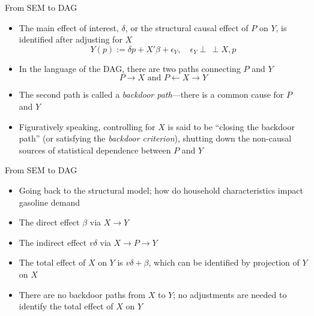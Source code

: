 \documentclass[aspectratio=1610,12pt,xcolor=dvipsnames]{beamer}
\newcommand{\indep}{\perp\!\!\!\, \perp}
\begin{document}
\begin{frame}{From SEM to DAG}

\begin{itemize}
    \item The main effect of interest, $\delta$, or the structural causal effect of $P$ on $Y$, is identified after adjusting for $X$
    \[Y(p) := \delta p + X'\beta + \epsilon_Y , \quad \epsilon_Y \indep X, p \]
    \item In the language of the DAG, there are two paths connecting $P$ and $Y$
    \[P \rightarrow X \text{ and } P \leftarrow X \rightarrow Y \]
    \item The second path is called a \textit{backdoor path}—there is a common cause for $P$ and $Y$
    \item Figuratively speaking, controlling for $X$ is said to be ``closing the backdoor path'' (or satisfying the \textit{backdoor criterion}), shutting down the non-causal sources of statistical dependence between $P$ and $Y$
\end{itemize}
\end{frame}

\begin{frame}{From SEM to DAG}

\begin{itemize}
    \item Going back to the structural model; how do household characteristics impact gasoline demand
    \item The direct effect $\beta$ via $X \rightarrow Y$
    \item The indirect effect $v\delta$ via $X \rightarrow P \rightarrow Y$
    \item The total effect of $X$ on $Y$ is $v \delta + \beta$, which can be identified by projection of $Y$ on $X$
    \item There are no backdoor paths from $X$ to $Y$; no adjustments are needed to identify the total effect of $X$ on $Y$
\end{itemize}

\centering
{}
\end{frame}
\end{document}
